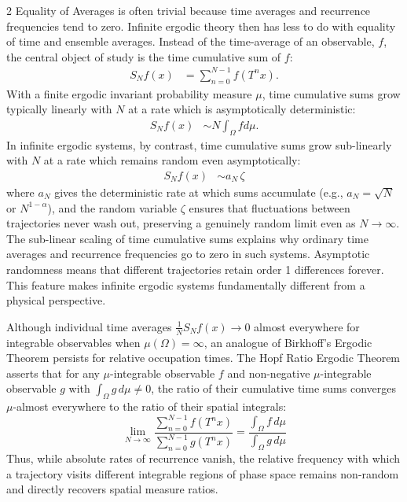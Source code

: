 \documentclass[11pt]{article}
\begin{document}
\begin{multicols}{2}
Equality of Averages is often trivial because time averages and recurrence frequencies tend to zero.
Infinite ergodic theory then has less to do with equality of time and ensemble averages.
Instead of the time-average of an observable, $f$, the central object of study is the time cumulative sum of $f$:
\begin{align}
\label{eq-timeCumulativeSum}
S_N f(x) &= \sum_{n=0}^{N-1} f(T^n x).
\end{align}
With a finite ergodic invariant probability measure $\mu$, time cumulative sums grow typically linearly with $N$ at a rate which is asymptotically deterministic:
\begin{align}
S_N f(x)  &\sim N \int_\Omega f d\mu.
\end{align}
In infinite ergodic systems, by contrast, time cumulative sums grow sub-linearly with $N$ at a rate which remains random even asymptotically:
\begin{align}
S_N f(x) & \sim a_N \, \zeta
\end{align}
where $a_N$ gives the deterministic rate at which sums accumulate (e.g., $a_N = \sqrt{N}$ or $N^{1-\alpha}$), and the random variable $\zeta$ ensures that fluctuations between trajectories never wash out, preserving a genuinely random limit even as $N \to \infty$.
The sub-linear scaling of time cumulative sums explains why ordinary time averages and recurrence frequencies go to zero in such systems.
Asymptotic randomness means that different trajectories retain order 1 differences forever.
This feature makes infinite ergodic systems fundamentally different from a physical perspective.

Although individual time averages $\frac{1}{N} S_N f(x) \to 0$ almost everywhere for integrable observables when $\mu(\Omega) = \infty$, an analogue of Birkhoff's Ergodic Theorem persists for relative occupation times. The Hopf Ratio Ergodic Theorem \cite{aaronson1997introduction} asserts that for any $\mu$-integrable observable $f$ and non-negative $\mu$-integrable observable $g$ with $\int_\Omega g \, d\mu \neq 0$, the ratio of their cumulative time sums converges $\mu$-almost everywhere to the ratio of their spatial integrals:$$\lim_{N\to\infty} \frac{\sum_{n=0}^{N-1} f(T^n x)}{\sum_{n=0}^{N-1} g(T^n x)} = \frac{\int_\Omega f \, d\mu}{\int_\Omega g \, d\mu}$$Thus, while absolute rates of recurrence vanish, the relative frequency with which a trajectory visits different integrable regions of phase space remains non-random and directly recovers spatial measure ratios.


\end{multicols}
\end{document}
